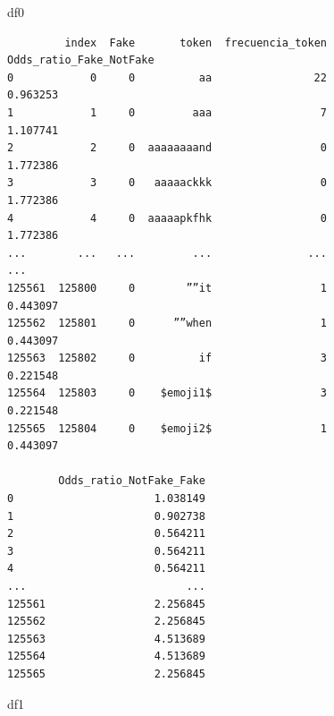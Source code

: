 \documentclass[
  11pt,
  a4paper,
]{article}
\newenvironment{Shaded}{\begin{snugshade}}{\end{snugshade}}
\newcommand{\NormalTok}[1]{#1}
\begin{document}
\begin{Shaded}
\begin{Highlighting}[]
\NormalTok{df0}
\end{Highlighting}
\end{Shaded}

\begin{verbatim}
         index  Fake       token  frecuencia_token  Odds_ratio_Fake_NotFake  
0            0     0          aa                22                 0.963253   
1            1     0         aaa                 7                 1.107741   
2            2     0  aaaaaaaand                 0                 1.772386   
3            3     0   aaaaackkk                 0                 1.772386   
4            4     0  aaaaapkfhk                 0                 1.772386   
...        ...   ...         ...               ...                      ...   
125561  125800     0        ””it                 1                 0.443097   
125562  125801     0      ””when                 1                 0.443097   
125563  125802     0          if                 3                 0.221548   
125564  125803     0    $emoji1$                 3                 0.221548   
125565  125804     0    $emoji2$                 1                 0.443097   

        Odds_ratio_NotFake_Fake  
0                      1.038149  
1                      0.902738  
2                      0.564211  
3                      0.564211  
4                      0.564211  
...                         ...  
125561                 2.256845  
125562                 2.256845  
125563                 4.513689  
125564                 4.513689  
125565                 2.256845  
\end{verbatim}

\begin{Shaded}
\begin{Highlighting}[]
\NormalTok{df1}
\end{Highlighting}
\end{Shaded}
\end{document}
